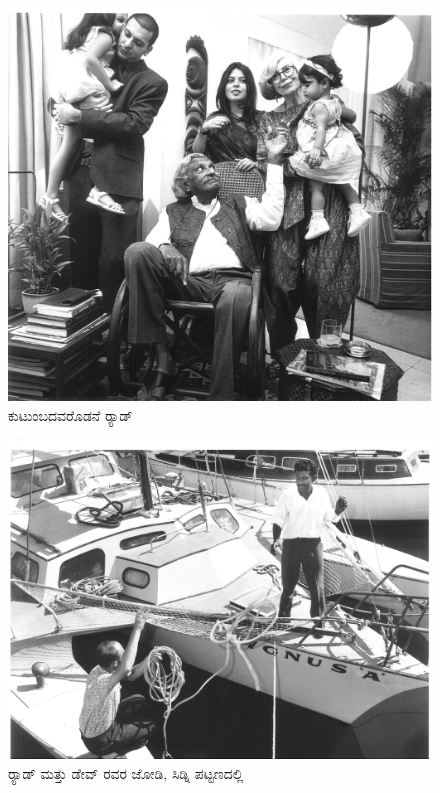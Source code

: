 \begin{figure}[!htpb]
\centering
\includegraphics[scale=0.19]{"images/19.jpg"}
\caption{ಕುಟುಂಬದವರೊಡನೆ ರ‍್ಯಾಡ್}\label{chap5-fig04}
\end{figure}


\begin{figure}[!htpb]
\centering
\includegraphics[scale=0.215]{"images/20.jpg"}
\caption{ರ‍್ಯಾಡ್ ಮತ್ತು ಡೇವ್ ರವರ ಜೋಡಿ, ಸಿಡ್ನಿ ಪಟ್ಟಣದಲ್ಲಿ }\label{chap5-fig05}
\end{figure}



